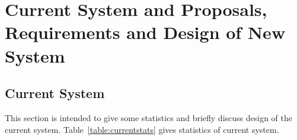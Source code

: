 
\chapter{Current System and Proposals, Requirements and Design of New System}\label{sec:currentsystemandproposals}

\section{Current System}\label{sec:currentsystem}
This section is intended to give some statistics and briefly discuss design of the current system. Table~\ref{table:currentstats} gives statistics 
of current system.
\begin{table}
\centering
{}
\caption{Statistics of Current System} \label{table:currentstats}
\end{table}

